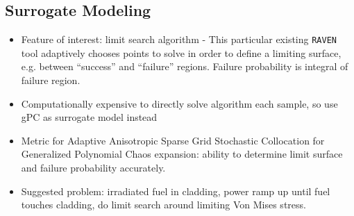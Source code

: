 \documentclass{article}
\begin{document}
\subsection{Surrogate Modeling}
  \begin{itemize}
  \item Feature of interest: limit search algorithm - This particular existing \texttt{RAVEN} tool adaptively chooses points to solve in order to define a limiting surface, e.g. between ``success'' and ``failure'' regions.  Failure probability is integral of failure region.
  \item Computationally expensive to directly solve algorithm each sample, so use gPC as surrogate model instead
  \item Metric for Adaptive Anisotropic Sparse Grid Stochastic Collocation for Generalized Polynomial Chaos expansion: ability to determine limit surface and failure probability accurately.
  \item Suggested problem: irradiated fuel in cladding, power ramp up until fuel touches cladding, do limit search around limiting Von Mises stress.
  \end{itemize}
\end{document}
